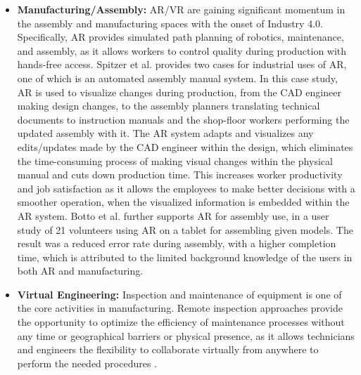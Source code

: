 \begin{itemize}
    \item \textbf{Manufacturing/Assembly:} AR/VR are gaining significant momentum in the assembly and manufacturing spaces with the onset of Industry 4.0. Specifically, AR provides simulated path planning of robotics, maintenance, and assembly, as it allows workers to control quality during production with hands-free access. Spitzer et al. \cite{Spitzer2020-df} provides two cases for industrial uses of AR, one of which is an automated assembly manual system.  In this case study, AR is used to visualize changes during production, from the CAD engineer making design changes, to the assembly planners translating technical documents to instruction manuals and the shop-floor workers performing the updated assembly with it. The AR system adapts and visualizes any edits/updates made by the CAD engineer within the design, which eliminates the time-consuming process of making visual changes within the physical manual and cuts down production time. This increases worker productivity and job satisfaction as it allows the employees to make better decisions with a smoother operation, when the visualized information is embedded within the AR system. Botto et al. \cite{Botto2020AugmentedRF}  further supports AR for assembly use, in a  user study of 21 volunteers using AR on a tablet for assembling given models. The result was a reduced error rate during assembly, with a higher completion time, which is attributed to the limited background knowledge of the users in both AR and manufacturing.
    \item \textbf{Virtual Engineering:} Inspection and maintenance of equipment is one of the core activities in manufacturing. Remote inspection  approaches provide the opportunity to optimize the efficiency of maintenance processes without any time or geographical barriers or physical presence, as it allows technicians and engineers the flexibility to collaborate virtually from anywhere to perform the needed procedures \cite{Linn2017-uc}. 

\end{itemize}
